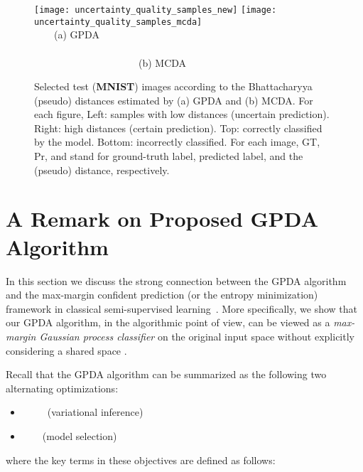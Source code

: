 \documentclass[10pt,letterpaper]{article}
\begin{document}
\begin{figure}\vspace{-1.0em}
\begin{center}
\texttt{[image: uncertainty\_quality\_samples\_new]}
\texttt{[image: uncertainty\_quality\_samples\_mcda]}\\
\ \ \ \ (a) GPDA \ \ \ \ \ \ \ \ \ \ \ \ \ \ \ \ \ \ \ \ \ \ \ \ \ \ \ \ \ \ \ \ \ \ \ \ \ \ \ \ \ \ \ \ \ \ \ \ \ \ \ \ \ \ \ \ \ \ \ \ \ \ \ \ \ \ \ \ \ \ \ \ \ \ \ \ \ \ \ \ \ (b) MCDA
\end{center}
\vspace{-1.5em}
\caption{Selected test (\textbf{MNIST}) images according to the Bhattacharyya (pseudo) distances estimated by (a) GPDA and (b) MCDA. For each figure, Left: samples with low distances (uncertain prediction). Right: high distances (certain prediction). Top: correctly classified by the model. Bottom: incorrectly classified. For each image, GT, Pr, and  stand for ground-truth label, predicted label, and the (pseudo) distance, respectively.}
\label{fig:uncertainty_samples_both}
\end{figure}




\section{A Remark on Proposed GPDA Algorithm}\label{sec:remark_max_margin}

In this section we discuss the strong connection between the GPDA algorithm and the max-margin confident prediction (or the entropy minimization) framework in classical semi-supervised learning~\cite{ssem04,semisup_book}. More specifically, we show that our GPDA algorithm, in the algorithmic point of view, can be viewed as a {\em max-margin Gaussian process classifier} on the original input space  without explicitly considering a shared space . 

Recall that the GPDA algorithm can be summarized as the following two alternating optimizations: 
\begin{mdframed}
\begin{itemize}
\item  \ \ \ \ \ (variational inference)
\item  \ \ \ \ (model selection)
\end{itemize}
\end{mdframed}
where the key terms in these objectives are defined as follows:
\end{document}

